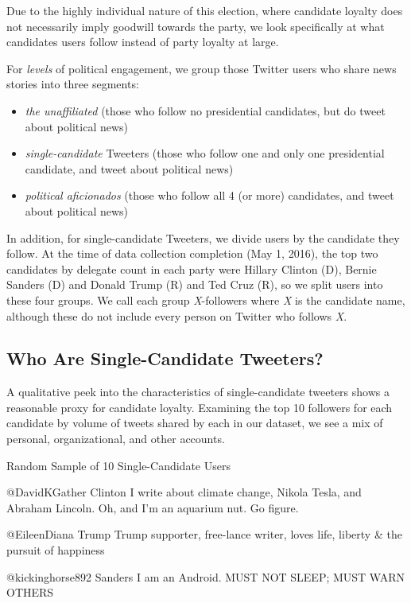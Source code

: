 Due to the highly individual nature of this election, where candidate loyalty does not necessarily imply goodwill towards the party, we look specifically at what candidates users follow instead of party loyalty at large. 

For \emph{levels} of political engagement, we group those Twitter users who share news stories into three segments: 

\begin{itemize}
  \item \emph{the unaffiliated} (those who follow no presidential candidates, but do tweet about political news)
  \item \emph{single-candidate} Tweeters (those who follow one and only one presidential candidate, and tweet about political news)
  \item \emph{political aficionados} (those who follow all 4 (or more) candidates, and tweet about political news)
\end{itemize}

In addition, for single-candidate Tweeters, we divide users by the candidate they follow. At the time of data collection completion (May 1, 2016), the top two candidates by delegate count in each party were Hillary Clinton (D), Bernie Sanders (D) and Donald Trump (R) and Ted Cruz (R), so we split users into these four groups. We call each group \emph{X}-followers where \emph{X} is the candidate name, although these do not include every person on Twitter who follows \emph{X}.  


\subsection{Who Are Single-Candidate Tweeters?}
A qualitative peek into the characteristics of single-candidate tweeters shows a reasonable proxy for candidate loyalty. Examining the top 10 followers for each candidate by volume of tweets shared by each in our dataset, we see a mix of personal, organizational, and other accounts.

Random Sample of 10  Single-Candidate Users

@DavidKGather 
Clinton
I write about climate change, Nikola Tesla, and Abraham Lincoln. Oh, and I'm an aquarium nut. Go figure.

@EileenDiana 
Trump
Trump supporter, free-lance writer, loves life, liberty \& the pursuit of happiness

@kickinghorse892 
Sanders
I am an Android. MUST NOT SLEEP; MUST WARN OTHERS

